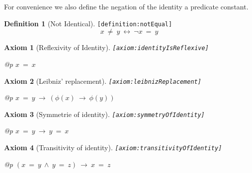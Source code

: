 \documentclass[a4paper,german,10pt,twoside]{book}
\newtheorem{ax}{Axiom}
\theoremstyle{definition}
\newtheorem{defn}{Definition}
\theoremstyle{remark}
\begin{document}
\par
For convenience we also define the negation of the identity a predicate constant.

\begin{defn}[Not Identical]
\label{definition:notEqual} \hypertarget{definition:notEqual}{}
{\tt \tiny [\verb]definition:notEqual]]}
$$x \ \neq \ y\ \leftrightarrow\ \neg x \ = \ y$$

\end{defn}


\begin{ax}[Reflexivity of Identity]
\label{axiom:identityIsReflexive} \hypertarget{axiom:identityIsReflexive}{}
{\tt \tiny [\verb]axiom:identityIsReflexive]]}
\mbox{}
\begin{longtable}{{@{\extracolsep{\fill}}p{\linewidth}}}
\centering $x \ = \ x$
\end{longtable}

\end{ax}


\begin{ax}[Leibniz' replacement]
\label{axiom:leibnizReplacement} \hypertarget{axiom:leibnizReplacement}{}
{\tt \tiny [\verb]axiom:leibnizReplacement]]}
\mbox{}
\begin{longtable}{{@{\extracolsep{\fill}}p{\linewidth}}}
\centering $x \ = \ y\ \rightarrow\ (\phi(x)\ \rightarrow\ \phi(y))$
\end{longtable}

\end{ax}


\begin{ax}[Symmetrie of identity]
\label{axiom:symmetryOfIdentity} \hypertarget{axiom:symmetryOfIdentity}{}
{\tt \tiny [\verb]axiom:symmetryOfIdentity]]}
\mbox{}
\begin{longtable}{{@{\extracolsep{\fill}}p{\linewidth}}}
\centering $x \ = \ y\ \rightarrow\ y \ = \ x$
\end{longtable}

\end{ax}


\begin{ax}[Transitivity of identity]
\label{axiom:transitivityOfIdentity} \hypertarget{axiom:transitivityOfIdentity}{}
{\tt \tiny [\verb]axiom:transitivityOfIdentity]]}
\mbox{}
\begin{longtable}{{@{\extracolsep{\fill}}p{\linewidth}}}
\centering $(x \ = \ y\ \land\ y \ = \ z)\ \rightarrow\ x \ = \ z$
\end{longtable}

\end{ax}
\end{document}
